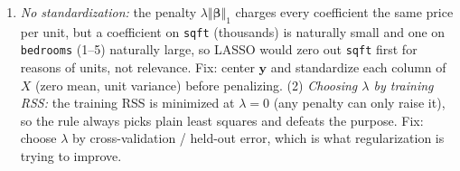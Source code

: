 \documentclass[
  11pt,
]{article}
\providecommand{\tightlist}{%
  \setlength{\itemsep}{0pt}\setlength{\parskip}{0pt}}
\begin{document}
\begin{solutionbox}
\begin{enumerate}
  \begin{enumerate}
  \def\labelenumii{(\arabic{enumii})}
  \tightlist
  \item
    \emph{No standardization:} the penalty
    \(\lambda\Vert\boldsymbol\beta\Vert_1\) charges every coefficient
    the same price per unit, but a coefficient on \texttt{sqft}
    (thousands) is naturally small and one on \texttt{bedrooms} (1--5)
    naturally large, so LASSO would zero out \texttt{sqft} first for
    reasons of units, not relevance. Fix: center \(\mathbf y\) and
    standardize each column of \(X\) (zero mean, unit variance) before
    penalizing. (2) \emph{Choosing \(\lambda\) by training RSS:} the
    training RSS is minimized at \(\lambda = 0\) (any penalty can only
    raise it), so the rule always picks plain least squares and defeats
    the purpose. Fix: choose \(\lambda\) by cross-validation / held-out
    error, which is what regularization is trying to improve.
  \end{enumerate}
\end{enumerate}

\end{solutionbox}
\end{document}
